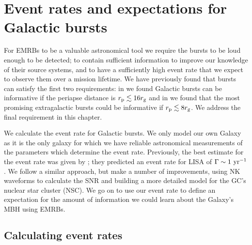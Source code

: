 \chapter{Event rates and expectations for Galactic bursts}\label{ch:events}

For EMRBs to be a valuable astronomical tool we require the bursts to be loud enough to be detected; to contain sufficient information to improve our knowledge of their source systems, and to have a sufficiently high event rate that we expect to observe them over a mission lifetime. We have previously found that bursts can satisfy the first two requirements: in  we found Galactic bursts can be informative if the periapse distance is $r_\mathrm{p} \lesssim 16 r_\mathrm{g}$ and in  we found that the most promising extragalactic bursts could be informative if $r_\mathrm{p} \lesssim 8 r_\mathrm{g}$. We address the final requirement in this chapter.

We calculate the event rate for Galactic bursts. We only model our own Galaxy as it is the only galaxy for which we have reliable astronomical measurements of the parameters which determine the event rate. Previously, the best estimate for the event rate was given by \citet{Hopman2007}; they predicted an event rate for LISA of $\Gamma \sim 1~\mathrm{yr^{-1}}$. We follow a similar approach, but make a number of improvements, using NK waveforms to calculate the SNR and building a more detailed model for the GC's nuclear star cluster (NSC). We go on to use our event rate to define an expectation for the amount of information we could learn about the Galaxy's MBH using EMRBs.

\section{Calculating event rates}\label{sec:Rates}

